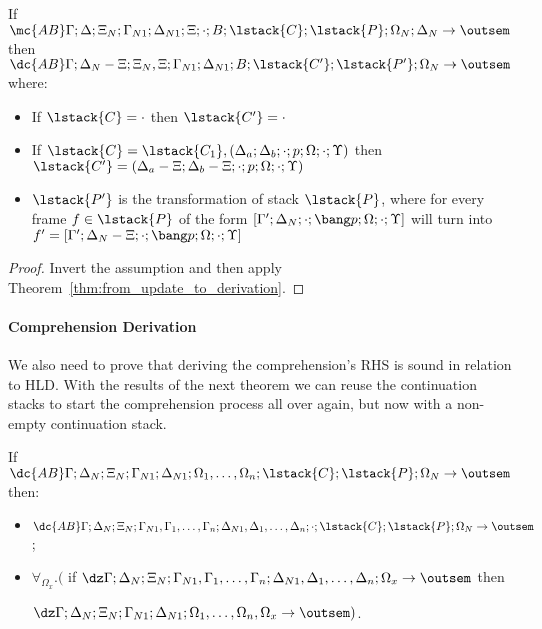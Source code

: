 \begin{corollary}\label{thm:match_to_derivation}
If $\mc{AB} \Gamma; \Delta; \Xi_N; \Gamma_{N1}; \Delta_{N1}; \Xi; \cdot; B;
\lstack{C}; \lstack{P};
\Omega_N; \Delta_N \rightarrow \outsem$ then\\
$\dc{AB} \Gamma; \Delta_N - \Xi; \Xi_N, \Xi; \Gamma_{N1}; \Delta_{N1}; B; \lstack{C'};
\lstack{P'}; \Omega_N \rightarrow \outsem$ where:
   
\begin{itemize}[leftmargin=*]
   \item If $\lstack{C} = \cdot$ then $\lstack{C'} = \cdot$
   \item If $\lstack{C} = \lstack{C_1}, (\Delta_a; \Delta_b; \cdot; p; \Omega;
         \cdot; \Upsilon)$ then $\lstack{C'} = (\Delta_a - \Xi; \Delta_b - \Xi; \cdot; p;
            \Omega; \cdot; \Upsilon)$
   \item $\lstack{P'}$ is the transformation of stack $\lstack{P}$, where for every frame $f \in
   \lstack{P}$ of the form $[\Gamma'; \Delta_N; \cdot; \bang p; \Omega; \cdot; \Upsilon]$
   will turn into $f' = [\Gamma';\Delta_N-\Xi;\cdot;\bang p;\Omega;\cdot;\Upsilon]$
\end{itemize}
\end{corollary}

\begin{proof}
Invert the assumption and then apply Theorem~\ref{thm:from_update_to_derivation}.
\end{proof}


\paragraph{Comprehension Derivation}

We also need to prove that deriving the comprehension's RHS is sound in
relation to HLD.  With the results of the next theorem we can reuse the
continuation stacks to start the comprehension process all over again, but now
with a non-empty continuation stack.

\begin{theorem}\label{thm:comprehension_derivation}
If $\dc{AB} \Gamma; \Delta_N; \Xi_N; \Gamma_{N1}; \Delta_{N1}; \Omega_1, \dotsc,
   \Omega_n; \lstack{C}; \lstack{P}; \Omega_N \rightarrow \outsem$ then:

\begin{itemize}[leftmargin=*]
   \item $\dc{AB} \Gamma; \Delta_N; \Xi_N; \Gamma_{N1}, \Gamma_1, \dotsc, \Gamma_n; \Delta_{N1},
   \Delta_1, \dotsc, \Delta_n; \cdot; \lstack{C}; \lstack{P}; \Omega_N \rightarrow
   \outsem$;

   \item $\forall_{\Omega_x}.($ if $\dz \Gamma; \Delta_N; \Xi_N;
   \Gamma_{N1}, \Gamma_1, \dotsc, \Gamma_n; \Delta_{N1}, \Delta_1, \dotsc,
   \Delta_n; \Omega_x \rightarrow \outsem$ then

   $\dz \Gamma; \Delta_N; \Xi_N; \Gamma_{N1}; \Delta_{N1}; \Omega_1, \dotsc,
   \Omega_n, \Omega_x \rightarrow \outsem)$.

\end{itemize}
\end{theorem}

